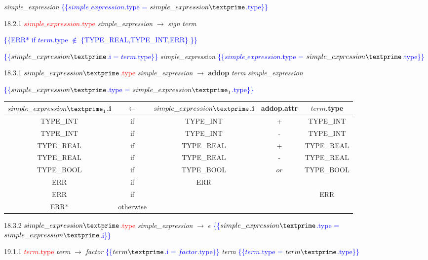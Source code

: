 \documentclass[10pt]{article}
\begin{document}
\emph{simple\_expression\textprime} \textcolor{blue}{\{\{$simple\_expression$.type = $simple\_expression\textprime$.type\}\}}

18.2.1 \textcolor{red}{$simple\_expression$.type} \emph{simple\_expression} $\rightarrow$ \emph{sign} \emph{term}

\textcolor{blue}{\{\{ERR* if $term$.type $\notin$ \{TYPE_REAL,TYPE_INT,ERR\} \}\}}

\textcolor{blue}{\{\{$simple\_expression\textprime$.i = $term$.type\}\}}
 \emph{simple\_expression\textprime} \textcolor{blue}{\{\{$simple\_expression$.type = $simple\_expression\textprime$.type\}\}}

 18.3.1  \textcolor{red}{$simple\_expression\textprime$.type} \emph{simple\_expression\textprime} $\rightarrow$ \textbf{addop} \emph{term} \emph{simple\_expression\textprime}

 \textcolor{blue}{\{\{$simple\_expression\textprime$.type = $simple\_expression\textprime_1$.type\}\}}

\begin{tabular}[t]{|c|c|c|c|c|}
  \hline

 $simple\_expression\textprime_1$.i & \textbf{$\leftarrow$} & $simple\_expression\textprime$.i & \textbf{addop}.attr &  $term$.type \\

  \hline

  TYPE_INT & if & TYPE_INT & + & TYPE_INT \\
  TYPE_INT & if & TYPE_INT & - & TYPE_INT \\
  TYPE_REAL & if & TYPE_REAL & + & TYPE_REAL \\
  TYPE_REAL & if & TYPE_REAL & - & TYPE_REAL \\
  TYPE_BOOL & if & TYPE_BOOL & $or$ & TYPE_BOOL \\
  ERR & if & ERR & & \\
  ERR & if & & & ERR \\
  ERR* & otherwise & & & \\
  \hline

\end{tabular}

18.3.2 \textcolor{red}{$simple\_expression\textprime$.type} \emph{simple\_expression\textprime} $\rightarrow$ $\epsilon$ \textcolor{blue}{\{\{$simple\_expression\textprime$.type = $simple\_expression\textprime$.i\}\}}

19.1.1 \textcolor{red}{$term$.type} \emph{term} $\rightarrow$ \emph{factor} \textcolor{blue}{\{\{$term\textprime$.i = $factor$.type\}\}} \emph{term\textprime} \textcolor{blue}{\{\{$term$.type = $term\textprime$.type\}\}}
\end{document}
